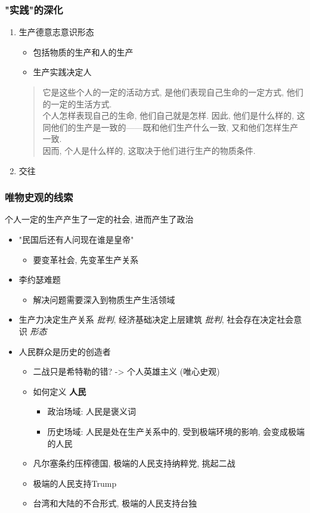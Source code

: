 \documentclass[11pt]{article}
\begin{document}
\subsubsection{"实践"的深化}
\label{sec:org6796421}
\begin{enumerate}
\item 生产\hfill{}\textsc{德意志意识形态}
\label{sec:org00855a1}
\begin{itemize}
\item 包括物质的生产和人的生产
\item 生产实践决定人
\end{itemize}
\begin{quote}
它是这些个人的一定的活动方式, 是他们表现自己生命的一定方式, 他们的一定的生活方式.\\
个人怎样表现自己的生命, 他们自己就是怎样. 因此, 他们是什么样的, 这同他们的生产是一致的——既和他们生产什么一致, 又和他们怎样生产一致.\\
因而, 个人是什么样的, 这取决于他们进行生产的物质条件.
\end{quote}
\item 交往
\label{sec:orge680c8d}
\end{enumerate}
\subsubsection{唯物史观的线索}
\label{sec:orgb52b406}
个人一定的生产产生了一定的社会, 进而产生了政治
\begin{itemize}
\item "民国后还有人问现在谁是皇帝"
\begin{itemize}
\item 要变革社会, 先变革生产关系
\end{itemize}
\item 李约瑟难题
\begin{itemize}
\item 解决问题需要深入到物质生产生活领域
\end{itemize}
\item 生产力决定生产关系 \emph{批判}, 经济基础决定上层建筑 \emph{批判}, 社会存在决定社会意识 \emph{形态}
\item 人民群众是历史的创造者
\begin{itemize}
\item 二战只是希特勒的错? -> 个人英雄主义 (唯心史观)
\item 如何定义 \textbf{人民}
\begin{itemize}
\item 政治场域: 人民是褒义词
\item 历史场域: 人民是处在生产关系中的, 受到极端环境的影响, 会变成极端的人民
\end{itemize}
\item 凡尔塞条约压榨德国, 极端的人民支持纳粹党, 挑起二战
\item 极端的人民支持Trump
\item 台湾和大陆的不合形式, 极端的人民支持台独
\end{itemize}
\end{itemize}
\end{document}

